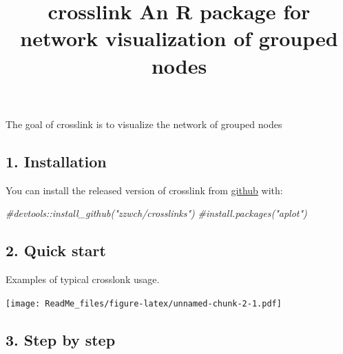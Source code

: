 \documentclass[
]{article}
\title{crosslink An R package for network visualization of grouped nodes}
\author{}
\date{\vspace{-2.5em}}
\newenvironment{Shaded}{\begin{snugshade}}{\end{snugshade}}
\newcommand{\CommentTok}[1]{\textcolor[rgb]{0.56,0.35,0.01}{\textit{#1}}}
\newcommand{\DataTypeTok}[1]{\textcolor[rgb]{0.13,0.29,0.53}{#1}}
\newcommand{\KeywordTok}[1]{\textcolor[rgb]{0.13,0.29,0.53}{\textbf{#1}}}
\newcommand{\NormalTok}[1]{#1}
\newcommand{\OperatorTok}[1]{\textcolor[rgb]{0.81,0.36,0.00}{\textbf{#1}}}
\newcommand{\StringTok}[1]{\textcolor[rgb]{0.31,0.60,0.02}{#1}}
\begin{document}
\maketitle

The goal of crosslink is to visualize the network of grouped nodes

\hypertarget{installation}{%
\subsection{1. Installation}\label{installation}}

You can install the released version of crosslink from
\href{https://github.com/zzwch/crosslink}{github} with:

\begin{Shaded}
\begin{Highlighting}[]
\CommentTok{#devtools::install_github("zzwch/crosslinks") }
\CommentTok{#install.packages("aplot")}
\end{Highlighting}
\end{Shaded}

\hypertarget{quick-start}{%
\subsection{2. Quick start}\label{quick-start}}

Examples of typical crosslonk usage.

\begin{Shaded}
\end{Shaded}

\texttt{[image: ReadMe\_files/figure-latex/unnamed-chunk-2-1.pdf]}

\hypertarget{step-by-step}{%
\subsection{3. Step by step}\label{step-by-step}}
\end{document}
